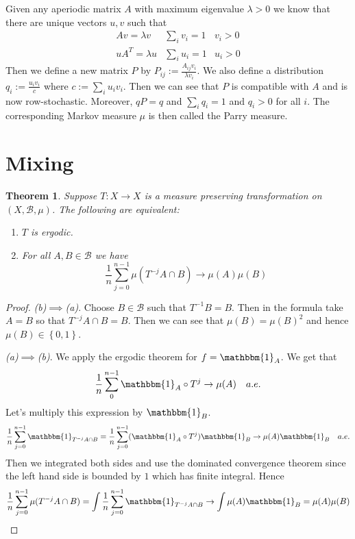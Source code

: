 \documentclass[11pt]{article}
\newcommand{\defeq}{:=}
\newcommand{\indic}[1]{\mathbbm{1}_{#1}}
\newcommand{\mdf}[1]{{\color{RoyalBlue} #1}}
\newtheorem{theorem}[prop]{Theorem}
\begin{document}
Given any aperiodic matrix $A$ with maximum eigenvalue $\lambda>0$ we know that there are unique vectors $u, v$ such that
\begin{align*}
	Av = \lambda v &\sum_{i}v_i=1 & v_i > 0 \\
	uA^T = \lambda u & \sum_{i}u_i =1 & u_i >0
\end{align*}
Then we define a new matrix $P$ by $P_{ij}\defeq\frac{A_{ij} v_i}{\lambda v_i}$.
We also define a distribution $q_i\defeq\frac{u_i v_i}{c}$ where $c\defeq \sum_{i}u_i v_i$.
Then we can see that $P$ is compatible with $A$ and is now row-stochastic.
Moreover, $qP=q$ and $\sum_{i}q_i = 1$ and $q_i>0$ for all $i$.
The corresponding Markov measure $\mu$ is then called the \mdf{Parry measure}.

\section{Mixing}
\begin{theorem}
Suppose $T:X \to X$ is a measure preserving transformation on $(X,\mathcal{B}, \mu)$.
The following are equivalent:
\begin{enumerate}[label=(\alph*)]
	\item $T$ is ergodic.
	\item For all $A,B\in\mathcal{B}$ we have
		\[
			\frac{1}{n}\sum_{j=0}^{n-1}\mu(T^{-j}A\cap B) \to \mu(A)\mu(B)
		\]
\end{enumerate}
\end{theorem}

\begin{proof}
\textit{(b)}$\implies$\textit{(a)}.
Choose $B\in\mathcal{B}$ such that $T^{-1}B=B$.
Then in the formula take $A=B$ so that $T^{-j}A\cap B=B$.
Then we can see that $\mu(B)=\mu(B)^2$ and hence $\mu(B)\in\left\{ 0, 1\right\}$.

\textit{(a)}$\implies$\textit{(b)}.
We apply the ergodic theorem for $f=\indic{A}$.
We get that
\[
	\frac{1}{n}\sum_{0}^{n-1}\indic{A}\circ T^j \to \mu(A) \quad a.e.
\]
Let's multiply this expression by $\indic{B}$.
\[
	\frac{1}{n}\sum_{j=0}^{n-1}\indic{T^{-j}A\cap B} = \frac{1}{n}\sum_{j=0}^{n-1}(\indic{A}\circ T^j)\indic{B} \to \mu(A)\indic{B}\quad a.e.
\]
Then we integrated both sides and use the dominated convergence theorem since the left hand side is bounded by $1$ which has finite integral.
Hence
\[
	\frac{1}{n}\sum_{j=0}^{n-1}\mu(T^{-j}A\cap B) = \int \frac{1}{n}\sum_{j=0}^{n-1}\indic{T^{-j}A\cap B} \to \int \mu(A) \indic{B} = \mu(A) \mu(B)
\]
\end{proof}
\end{document}
